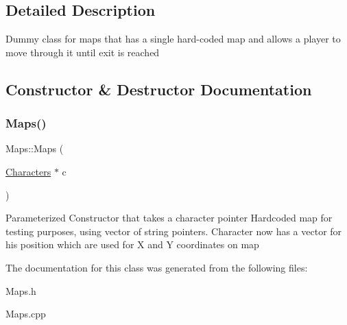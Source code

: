 \subsection{Detailed Description}
Dummy class for maps that has a single hard-\/coded map and allows a player to move through it until exit is reached 

\subsection{Constructor \& Destructor Documentation}
\hypertarget{class_maps_a7396b48b15d3044eaba86e0d6c6bce11}{}\label{class_maps_a7396b48b15d3044eaba86e0d6c6bce11} 
\subsubsection{\texorpdfstring{Maps()}{Maps()}}
{\footnotesize\ttfamily Maps\+::\+Maps (\begin{DoxyParamCaption}\item[{\hyperlink{class_characters}{Characters} $\ast$}]{c }\end{DoxyParamCaption})}

Parameterized Constructor that takes a character pointer Hardcoded map for testing purposes, using vector of string pointers. Character now has a vector for his position which are used for X and Y coordinates on map 

The documentation for this class was generated from the following files\+:\begin{DoxyCompactItemize}
\item 
Maps.\+h\item 
Maps.\+cpp\end{DoxyCompactItemize}
